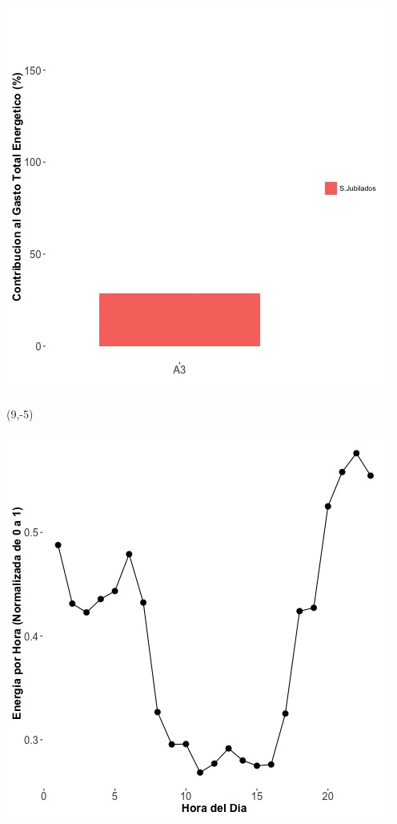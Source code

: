 \documentclass{article}\usepackage[]{graphicx}\usepackage[]{color}
\newenvironment{knitrout}{}{} %
\begin{document}
\begin{knitrout}
\color{fgcolor}
\includegraphics[scale=0.65]{figure/A3_subvars_plot.jpg} 
\end{knitrout}

 \begin{textblock}{1}(9,-5)
\begin{minipage}{20em}
\begingroup

\endgroup
\end{minipage}
\end{textblock}

\begin{knitrout}
\color{fgcolor}
\includegraphics[scale=0.65]{figure/A3_plot_norm_median} 
\end{knitrout}
\end{document}
